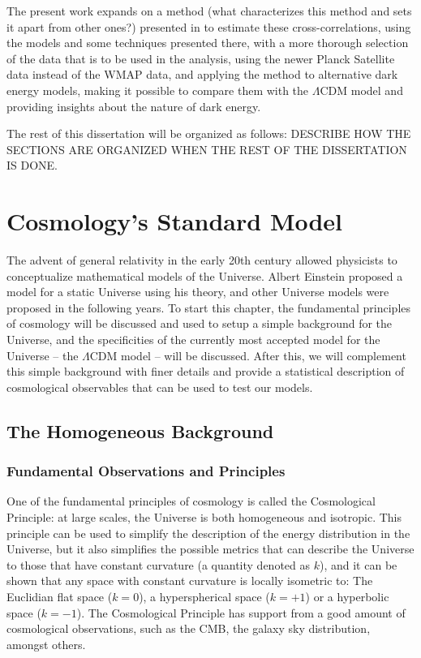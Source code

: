\documentclass[openany,a4paper,12pt,oneside]{book}
\begin{document}
\begin{spacing}{1.5}
The present work expands on a method (what characterizes this method and sets it apart from other ones?) presented in \cite{Moura-Santos_2016} to estimate these cross-correlations, using the models and some techniques presented there, with a more thorough selection of the data that is to be used in the analysis, using the newer Planck Satellite data instead of the WMAP data, and applying the method to alternative dark energy models, making it possible to compare them with the $\Lambda $CDM model and providing insights about the nature of dark energy. 

The rest of this dissertation will be organized as follows: DESCRIBE HOW THE SECTIONS ARE ORGANIZED WHEN THE REST OF THE DISSERTATION IS DONE.

\chapter{Cosmology's Standard Model}

The advent of general relativity in the early 20th century allowed physicists to conceptualize mathematical models of the Universe. Albert Einstein proposed a model for a static Universe using his theory\cite{Einstein:1917ce}, and other Universe models were proposed in the following years. To start this chapter, the fundamental principles of cosmology will be discussed and used to setup a simple background for the Universe, and the specificities of the currently most accepted model for the Universe -- the $\Lambda$CDM model -- will be discussed. After this, we will complement this simple background with finer details and provide a statistical description of cosmological observables that can be used to test our models.

\section{The Homogeneous Background}

\subsection{Fundamental Observations and Principles}

One of the fundamental principles of cosmology is called the Cosmological Principle: at large scales, the Universe is both homogeneous and isotropic. This principle can be used to simplify the description of the energy distribution in the Universe, but it also simplifies the possible metrics that can describe the Universe to those that have constant curvature (a quantity denoted as $k$), and it can be shown that any space with constant curvature is locally isometric to: The Euclidian flat space ($k=0$), a hyperspherical space ($k=+1$) or a hyperbolic space ($k=-1$)\cite{choquet2008general}. The Cosmological Principle has support from a good amount of cosmological observations, such as the CMB\cite{COBE}, the galaxy sky distribution\cite{galaxy_isotropy, galaxy_homogeneity_Pandey_2021}, amongst others. 


\end{spacing}
\end{document}
